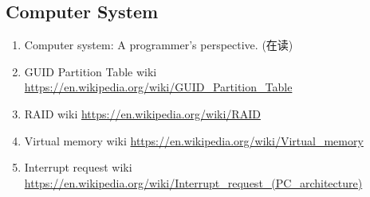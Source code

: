 \documentclass{article}
\begin{document}
\subsection{Computer System}
\begin{enumerate}
    \item Computer system: A programmer's perspective. (在读)
    \item GUID Partition Table wiki
          \url{https://en.wikipedia.org/wiki/GUID_Partition_Table}
    \item RAID wiki
          \url{https://en.wikipedia.org/wiki/RAID}
    \item Virtual memory wiki
          \url{https://en.wikipedia.org/wiki/Virtual_memory}
    \item Interrupt request wiki
          \url{https://en.wikipedia.org/wiki/Interrupt_request_(PC_architecture)}
\end{enumerate}
\end{document}
